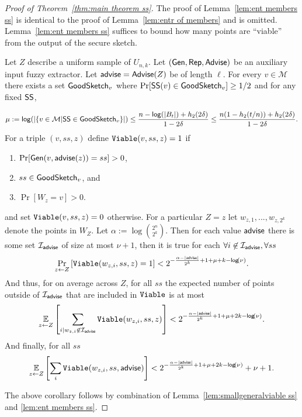 \begin{proof}[Proof of Theorem~\ref{thm:main theorem ss}]
The proof of Lemma~\ref{lem:ent members ss} is identical to the proof of Lemma~\ref{lem:entr of members} and is omitted. 
Lemma~\ref{lem:ent members ss} suffices to bound how many points are ``viable'' from the output of the secure sketch.


\begin{corollary}
\label{corollary:info loss ss}
Let $Z$ describe a uniform sample of $U_{n,k}$.  Let $({\mathsf{Gen}}, {\mathsf{Rep}}, {\mathsf{Advise}})$ be an auxiliary input fuzzy extractor.  Let ${\mathsf{advise}} = {\mathsf{Advise}}(Z)$ be of length $\ell$.       For every $v\in \mathcal{M}$ there exists a set $\mathsf{GoodSketch}_v$ where $\Pr[{\mathsf{SS}}(v)\in \mathsf{GoodSketch}_v] \ge 1/2$ and for any fixed ${\mathsf{SS}}$,
    
    \[
    \mu:=\mathsf{log}\!\left(|\{v \in \mathcal{M} | {\mathsf{SS}} \in \mathsf{GoodSketch}_v\}|\right) \le \frac{n - \mathsf{log}\!\left(|B_t|\right) +h_2(2\delta)}{1-2\delta} \le \frac{n(1-h_2(t/n)) +h_2(2\delta)}{1-2\delta}.
    \]
For a triple $(v, ss, z)$ define $\mathtt{Viable}(v, ss, z)=1$ if
\begin{enumerate}
\itemsep0em
\item $\Pr[{\mathsf{Gen}}(v, {\mathsf{advise}}(z)) = ss]>0$,
\item $ss\in\mathsf{GoodSketch}_v$, and
\item $\Pr[W_z = v]>0$.
\end{enumerate}
and set $\mathtt{Viable}(v, ss, z)=0$ otherwise. 
 For a particular $Z=z$ let $w_{z,1},..., w_{z,2^k}$ denote the points in $W_Z$. Let $\alpha:= \log {2^n\choose 2^k}$.  
 Then for each value ${\mathsf{advise}}$ there is some set $\mathcal{I}_{{\mathsf{advise}}}$ of size at most $\nu+1$, then it is true for each $\forall i\not \in \mathcal{I}_{\mathsf{advise}}, \forall ss$
\[
\Pr_{z\leftarrow Z}\left[\mathtt{Viable}(w_{z,i},ss,z) =1\right]< 2^{-\frac{\alpha-|{\mathsf{advise}}|}{2^k}+1+\mu + k-\mathsf{log}\!\left(\nu\right)}.
\]
And thus, for on average across $Z$, for all $ss$ the expected number of points outside of $\mathcal{I}_{\mathsf{advise}}$ that are included in $\mathtt{Viable}$ is at most 
\begin{align*}
\operatorname*{\mathbb{E}}_{z\leftarrow Z} \left[\sum_{i | w_{z,i}\not\in\mathcal{I}_{\mathsf{advise}}} \mathtt{Viable}(w_{z,i}, ss, z) \right]< 2^{-\frac{\alpha- |{\mathsf{advise}}|}{2^k}+1+\mu+2k-\mathsf{log}\!\left(\nu\right)}.
\end{align*}
And finally, for all $ss$
\begin{align*}
\operatorname*{\mathbb{E}}_{z\leftarrow Z} \left[\sum_{i }  \mathtt{Viable}(w_{z,i}, ss, {\mathsf{advise}})  \right]< 2^{-\frac{\alpha-|{\mathsf{advise}}|}{2^k}+1+\mu+2k-\mathsf{log}\!\left(\nu\right)}+\nu+1.
\end{align*}
\end{corollary}
\noindent
The above corollary follows by combination of Lemma~\ref{lem:smallgeneralviable ss} and \ref{lem:ent members ss}.
\end{proof}
